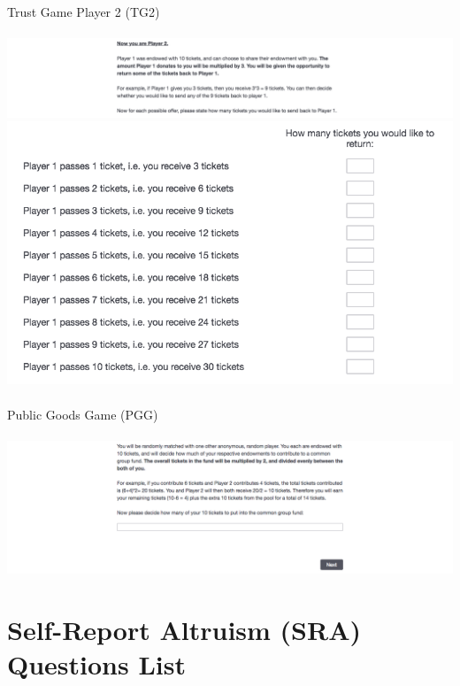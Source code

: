 \documentclass[12pt]{article}
\begin{document}
{\noindent Trust Game Player 2 (TG2) \\ \\
\includegraphics[scale=0.35]{trust2} \\
\includegraphics[scale=0.35]{trust3} \\ \\
\noindent Public Goods Game (PGG) \\ \\
\includegraphics[scale=0.35]{public} \\


\section{Self-Report Altruism (SRA) Questions List} \label{app:b}


}
\end{document}
